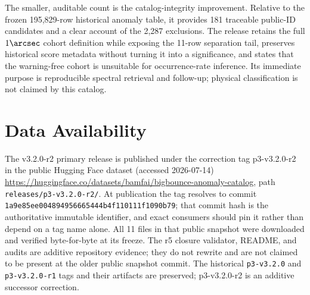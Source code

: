 \documentclass[twocolumn,linenumbers]{aastex702}
\newcommand{\releaseVersion}{v3.2.0-r2}
\newcommand{\releaseTag}{p3-v3.2.0-r2}
\newcommand{\releaseRevision}{1a9e85ee004894956665444b4f110111f1090b79}
\begin{document}
The smaller, auditable count is the catalog-integrity improvement.  Relative to the frozen
195,829-row historical anomaly table, it provides 181 traceable public-ID candidates and a clear account
of the 2,287 exclusions.  The release retains the full $1\arcsec$ cohort definition while exposing
the 11-row separation tail, preserves historical score metadata without turning it into a
significance, and states that the warning-free cohort is unsuitable for occurrence-rate
inference.  Its immediate purpose is reproducible spectral retrieval and follow-up; physical
classification is not claimed by this catalog.

\section*{Data Availability}

The \releaseVersion{} primary release is published under the correction tag \releaseTag{} in the
public Hugging Face dataset (accessed 2026-07-14)
\url{https://huggingface.co/datasets/bamfai/bigbounce-anomaly-catalog}, path
\nolinkurl{releases/p3-v3.2.0-r2/}.  At publication the tag resolves to commit
\texttt{\releaseRevision}; that commit hash is the authoritative immutable identifier, and exact
consumers should pin it rather than depend on a tag name alone.  All 11 files in that public
snapshot were downloaded and verified byte-for-byte at its freeze.  The r5 closure validator,
README, and audits are additive repository evidence; they do not rewrite and are not claimed to
be present at the older public snapshot commit.  The
historical \texttt{p3-v3.2.0} and \texttt{p3-v3.2.0-r1} tags and their artifacts are preserved;
\releaseTag{} is an additive successor correction.
\end{document}
